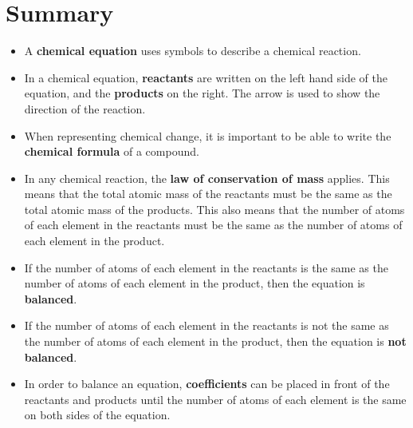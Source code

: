 
\section{Summary}

\begin{itemize}
\item{A \textbf{chemical equation} uses symbols to describe a chemical reaction.}
\item{In a chemical equation, \textbf{reactants} are written on the left hand side of the equation, and the \textbf{products} on the right. The arrow is used to show the direction of the reaction.}
\item{When representing chemical change, it is important to be able to write the \textbf{chemical formula} of a compound.}
\item{In any chemical reaction, the \textbf{law of conservation of mass} applies. This means that the total atomic mass of the reactants must be the same as the total atomic mass of the products. This also means that the number of atoms of each element in the reactants must be the same as the number of atoms of each element in the product.}
\item{If the number of atoms of each element in the reactants is the same as the number of atoms of each element in the product, then the equation is \textbf{balanced}.}
\item{If the number of atoms of each element in the reactants is not the same as the number of atoms of each element in the product, then the equation is \textbf{not balanced}.}
\item{In order to balance an equation, \textbf{coefficients} can be placed in front of the reactants and products until the number of atoms of each element is the same on both sides of the equation.}
\end{itemize}

